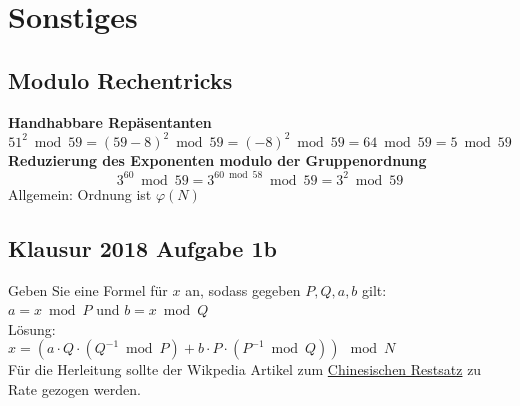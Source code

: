 \documentclass[10pt,a4paper]{article}
\begin{document}
        \section{Sonstiges}
        \subsection{Modulo Rechentricks}
        \textbf{Handhabbare Repäsentanten}
        \[51^2 \bmod 59 = (59-8)^2 \bmod 59 = (-8)^2 \bmod 59 = 64 \bmod 59 = 5 \bmod 59\]
        \textbf{Reduzierung des Exponenten modulo der Gruppenordnung}
        \[3^{60} \bmod 59 = 3^{60 \bmod 58} \bmod 59 = 3^2 \bmod 59\]
        Allgemein: Ordnung ist \(\varphi(N)\)
        \subsection{Klausur 2018 Aufgabe 1b}
        Geben Sie eine Formel für \(x\) an, sodass gegeben \(P, Q, a, b\) gilt:\\
        \(a = x \bmod P\) und \(b = x \bmod Q\)\\
        Lösung:\\
        \(x = ( a \cdot Q  \cdot (Q^{-1} \bmod P) + b \cdot P \cdot (P^{-1} \bmod Q)) \mod N\)\\
        Für die Herleitung sollte der Wikpedia Artikel zum
        \href{https://de.wikipedia.org/wiki/Chinesischer_Restsatz}{Chinesischen Restsatz}
        zu Rate gezogen werden.
\end{document}
